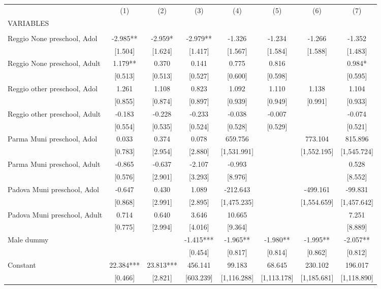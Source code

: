\begin{tabular}{lccccccc} \hline
 & (1) & (2) & (3) & (4) & (5) & (6) & (7) \\
VARIABLES &  &  &  &  &  &  &  \\ \hline
 &  &  &  &  &  &  &  \\
Reggio None preschool, Adol & -2.985** & -2.959* & -2.979** & -1.326 & -1.234 & -1.266 & -1.352 \\
 & [1.504] & [1.624] & [1.417] & [1.567] & [1.584] & [1.588] & [1.483] \\
Reggio None preschool, Adult & 1.179** & 0.370 & 0.141 & 0.775 & 0.816 &  & 0.984* \\
 & [0.513] & [0.513] & [0.527] & [0.600] & [0.598] &  & [0.595] \\
Reggio other preschool, Adol & 1.261 & 1.108 & 0.823 & 1.092 & 1.110 & 1.138 & 1.104 \\
 & [0.855] & [0.874] & [0.897] & [0.939] & [0.949] & [0.991] & [0.933] \\
Reggio other preschool, Adult & -0.183 & -0.228 & -0.233 & -0.038 & -0.007 &  & -0.074 \\
 & [0.554] & [0.535] & [0.524] & [0.528] & [0.529] &  & [0.521] \\
Parma Muni preschool, Adol & 0.033 & 0.374 & 0.078 & 659.756 &  & 773.104 & 815.896 \\
 & [0.783] & [2.954] & [2.880] & [1,531.991] &  & [1,552.195] & [1,545.724] \\
Parma Muni preschool, Adult & -0.865 & -0.637 & -2.107 & -0.993 &  &  & 0.528 \\
 & [0.576] & [2.901] & [3.293] & [8.976] &  &  & [8.552] \\
Padova Muni preschool, Adol & -0.647 & 0.430 & 1.089 & -212.643 &  & -499.161 & -99.831 \\
 & [0.868] & [2.991] & [2.895] & [1,475.235] &  & [1,554.659] & [1,457.642] \\
Padova Muni preschool, Adult & 0.714 & 0.640 & 3.646 & 10.665 &  &  & 7.251 \\
 & [0.775] & [2.994] & [4.016] & [9.364] &  &  & [8.889] \\
Male dummy &  &  & -1.415*** & -1.965** & -1.980** & -1.995** & -2.057** \\
 &  &  & [0.454] & [0.817] & [0.814] & [0.862] & [0.812] \\
Constant & 22.384*** & 23.813*** & 456.141 & 99.183 & 68.645 & 230.102 & 196.017 \\
 & [0.466] & [2.821] & [603.239] & [1,116.288] & [1,113.178] & [1,185.681] & [1,118.890] \\

\end{tabular}
